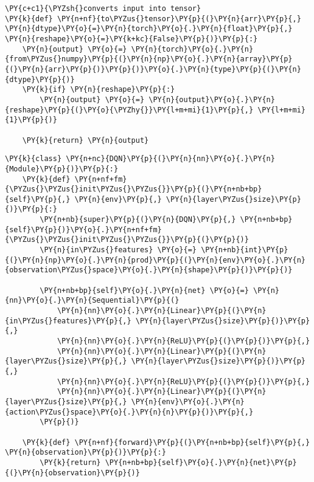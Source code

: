     \begin{tcolorbox}[breakable, size=fbox, boxrule=1pt, pad at break*=1mm,colback=cellbackground, colframe=cellborder]
\begin{Verbatim}[commandchars=\\\{\}]
\PY{c+c1}{\PYZsh{}converts input into tensor}
\PY{k}{def} \PY{n+nf}{to\PYZus{}tensor}\PY{p}{(}\PY{n}{arr}\PY{p}{,} \PY{n}{dtype}\PY{o}{=}\PY{n}{torch}\PY{o}{.}\PY{n}{float}\PY{p}{,} \PY{n}{reshape}\PY{o}{=}\PY{k+kc}{False}\PY{p}{)}\PY{p}{:}
    \PY{n}{output} \PY{o}{=} \PY{n}{torch}\PY{o}{.}\PY{n}{from\PYZus{}numpy}\PY{p}{(}\PY{n}{np}\PY{o}{.}\PY{n}{array}\PY{p}{(}\PY{n}{arr}\PY{p}{)}\PY{p}{)}\PY{o}{.}\PY{n}{type}\PY{p}{(}\PY{n}{dtype}\PY{p}{)}
    \PY{k}{if} \PY{n}{reshape}\PY{p}{:}
        \PY{n}{output} \PY{o}{=} \PY{n}{output}\PY{o}{.}\PY{n}{reshape}\PY{p}{(}\PY{o}{\PYZhy{}}\PY{l+m+mi}{1}\PY{p}{,} \PY{l+m+mi}{1}\PY{p}{)}

    \PY{k}{return} \PY{n}{output}
\end{Verbatim}
\end{tcolorbox}

    \begin{tcolorbox}[breakable, size=fbox, boxrule=1pt, pad at break*=1mm,colback=cellbackground, colframe=cellborder]
\begin{Verbatim}[commandchars=\\\{\}]
\PY{k}{class} \PY{n+nc}{DQN}\PY{p}{(}\PY{n}{nn}\PY{o}{.}\PY{n}{Module}\PY{p}{)}\PY{p}{:}
    \PY{k}{def} \PY{n+nf+fm}{\PYZus{}\PYZus{}init\PYZus{}\PYZus{}}\PY{p}{(}\PY{n+nb+bp}{self}\PY{p}{,} \PY{n}{env}\PY{p}{,} \PY{n}{layer\PYZus{}size}\PY{p}{)}\PY{p}{:}
        \PY{n+nb}{super}\PY{p}{(}\PY{n}{DQN}\PY{p}{,} \PY{n+nb+bp}{self}\PY{p}{)}\PY{o}{.}\PY{n+nf+fm}{\PYZus{}\PYZus{}init\PYZus{}\PYZus{}}\PY{p}{(}\PY{p}{)}
        \PY{n}{in\PYZus{}features} \PY{o}{=} \PY{n+nb}{int}\PY{p}{(}\PY{n}{np}\PY{o}{.}\PY{n}{prod}\PY{p}{(}\PY{n}{env}\PY{o}{.}\PY{n}{observation\PYZus{}space}\PY{o}{.}\PY{n}{shape}\PY{p}{)}\PY{p}{)}

        \PY{n+nb+bp}{self}\PY{o}{.}\PY{n}{net} \PY{o}{=} \PY{n}{nn}\PY{o}{.}\PY{n}{Sequential}\PY{p}{(}
            \PY{n}{nn}\PY{o}{.}\PY{n}{Linear}\PY{p}{(}\PY{n}{in\PYZus{}features}\PY{p}{,} \PY{n}{layer\PYZus{}size}\PY{p}{)}\PY{p}{,}
            \PY{n}{nn}\PY{o}{.}\PY{n}{ReLU}\PY{p}{(}\PY{p}{)}\PY{p}{,}
            \PY{n}{nn}\PY{o}{.}\PY{n}{Linear}\PY{p}{(}\PY{n}{layer\PYZus{}size}\PY{p}{,} \PY{n}{layer\PYZus{}size}\PY{p}{)}\PY{p}{,}
            \PY{n}{nn}\PY{o}{.}\PY{n}{ReLU}\PY{p}{(}\PY{p}{)}\PY{p}{,}
            \PY{n}{nn}\PY{o}{.}\PY{n}{Linear}\PY{p}{(}\PY{n}{layer\PYZus{}size}\PY{p}{,} \PY{n}{env}\PY{o}{.}\PY{n}{action\PYZus{}space}\PY{o}{.}\PY{n}{n}\PY{p}{)}\PY{p}{,}
        \PY{p}{)}

    \PY{k}{def} \PY{n+nf}{forward}\PY{p}{(}\PY{n+nb+bp}{self}\PY{p}{,} \PY{n}{observation}\PY{p}{)}\PY{p}{:}
        \PY{k}{return} \PY{n+nb+bp}{self}\PY{o}{.}\PY{n}{net}\PY{p}{(}\PY{n}{observation}\PY{p}{)}
\end{Verbatim}
\end{tcolorbox}


